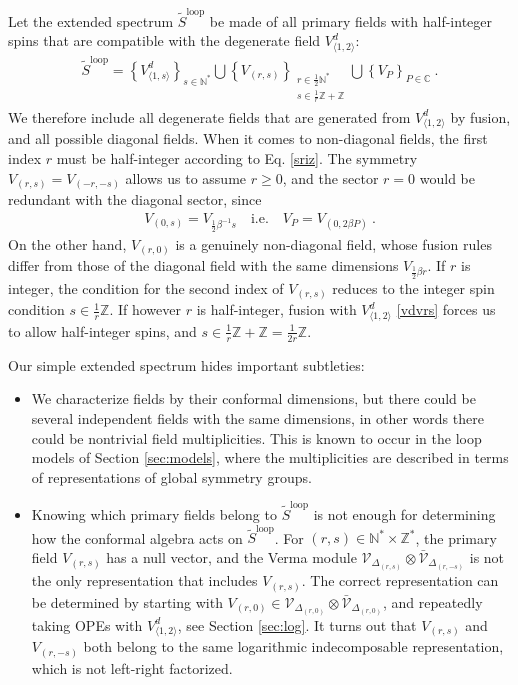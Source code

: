 \documentclass[12pt, a4paper]{article}
\theoremstyle{break}
\begin{document}
Let the extended spectrum $\widetilde{S}^\text{loop}$ be made of all primary fields with half-integer spins that are compatible with the degenerate field $V^d_{\langle 1,2\rangle}$:
\begin{align}
 \boxed{\widetilde{S}^\text{loop} = \left\{V^d_{\langle 1,s\rangle}\right\}_{s\in\mathbb{N}^*}  \bigcup \left\{V_{(r,s)}\right\}_{\substack{r\in \frac12\mathbb{N}^*\\ s\in\frac{1}{r}\mathbb{Z}+\mathbb{Z}}}\bigcup \left\{ V_P\right\}_{P\in\mathbb{C}} } \ .
\end{align}
We therefore include all degenerate fields that are generated from $V^d_{\langle 1,2\rangle}$ by fusion, and all possible diagonal fields. When it comes to non-diagonal fields, the first index $r$ must be half-integer according to Eq. \eqref{sriz}. The symmetry $V_{(r,s)}=V_{(-r,-s)}$ allows us to assume $r\geq 0$, and the sector $r=0$ would be redundant with the diagonal sector, since 
\begin{align}
 V_{(0,s)} = V_{\frac12\beta^{-1}s}  \quad \text{i.e.} \quad V_P = V_{(0,2\beta P)} \ .
 \label{sP}
\end{align}
On the other hand, $V_{(r,0)}$ is a genuinely non-diagonal field, whose fusion rules differ from those of the diagonal field with the same dimensions $V_{\frac12\beta r}$. 
If $r$ is integer, the condition for the second index of $V_{(r,s)}$ reduces to the integer spin condition $s\in\frac{1}{r}\mathbb{Z}$. If however $r$ is half-integer, fusion with $V^d_{\langle 1,2\rangle}$ \eqref{vdvrs} forces us to allow half-integer spins, and $s\in \frac{1}{r}\mathbb{Z} + \mathbb{Z} = \frac{1}{2r}\mathbb{Z}$. 

Our simple extended spectrum hides important subtleties: 
\begin{itemize}
 \item We characterize fields by their conformal dimensions, but there could be several independent fields with the same dimensions, in other words there could be nontrivial field multiplicities. This is known to occur in the loop models of Section \ref{sec:models}, where the multiplicities are described in terms of representations of global symmetry groups.  
 \item Knowing which primary fields belong to $\widetilde{S}^\text{loop}$ is not enough for determining how the conformal algebra acts on $\widetilde{S}^\text{loop}$. For $(r,s)\in \mathbb{N}^*\times \mathbb{Z}^*$, the primary field $V_{(r,s)}$ has a null vector, and the Verma module $\mathcal{V}_{\Delta_{(r,s)}}\otimes\bar{\mathcal{V}}_{\Delta_{(r,-s)}}$ is not the only representation that includes $V_{(r,s)}$. The correct representation can be determined by starting with $V_{(r,0)}\in \mathcal{V}_{\Delta_{(r,0)}}\otimes\bar{\mathcal{V}}_{\Delta_{(r,0)}}$, and repeatedly taking OPEs with $V^d_{\langle 1,2\rangle}$, see Section \ref{sec:log}. It turns out that $V_{(r,s)}$ and $V_{(r,-s)}$ both belong to the same logarithmic indecomposable representation, which is not left-right factorized. 
\end{itemize}
\end{document}
